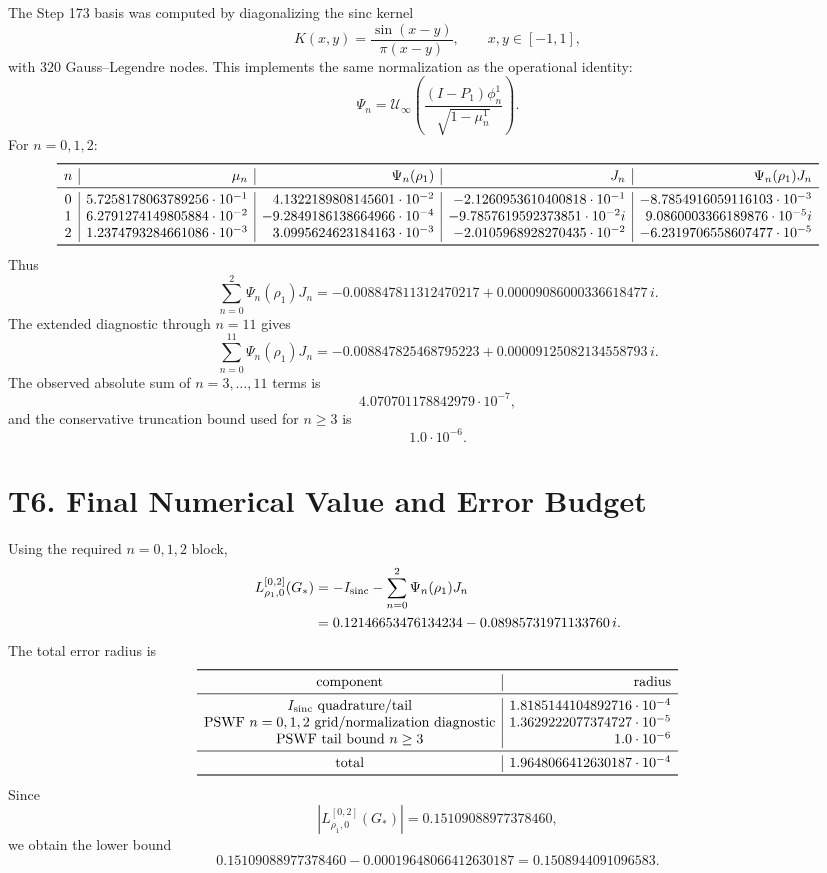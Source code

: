 \documentclass[11pt]{article}
\begin{document}
The Step 173 basis was computed by diagonalizing the sinc kernel
\[
K(x,y)=\frac{\sin(x-y)}{\pi(x-y)},\qquad x,y\in[-1,1],
\]
with \(320\) Gauss--Legendre nodes.  This implements the same normalization as
the operational identity:
\[
\Psi_n=\mathcal U_\infty
\left(\frac{(I-P_1)\phi_n^1}{\sqrt{1-\mu_n^1}}\right).
\]
For \(n=0,1,2\):
\[
\begin{array}{c|r|r|r|r}
\toprule
n & \mu_n & \Psi_n(\rho_1) & J_n & \Psi_n(\rho_1)J_n\\
\midrule
0 & 5.7258178063789256\cdot10^{-1}
& 4.1322189808145601\cdot10^{-2}
& -2.1260953610400818\cdot10^{-1}
& -8.7854916059116103\cdot10^{-3}\\
1 & 6.2791274149805884\cdot10^{-2}
& -9.2849186138664966\cdot10^{-4}
& -9.7857619592373851\cdot10^{-2}i
& 9.0860003366189876\cdot10^{-5}i\\
2 & 1.2374793284661086\cdot10^{-3}
& 3.0995624623184163\cdot10^{-3}
& -2.0105968928270435\cdot10^{-2}
& -6.2319706558607477\cdot10^{-5}\\
\bottomrule
\end{array}
\]
Thus
\[
\sum_{n=0}^{2}\Psi_n(\rho_1)J_n
=-0.008847811312470217
+0.00009086000336618477\,i.
\]
The extended diagnostic through \(n=11\) gives
\[
\sum_{n=0}^{11}\Psi_n(\rho_1)J_n
=-0.008847825468795223
+0.00009125082134558793\,i.
\]
The observed absolute sum of \(n=3,\ldots,11\) terms is
\[
4.070701178842979\cdot10^{-7},
\]
and the conservative truncation bound used for \(n\ge3\) is
\[
1.0\cdot10^{-6}.
\]

\section{T6. Final Numerical Value and Error Budget}

Using the required \(n=0,1,2\) block,
\[
\begin{aligned}
L_{\rho_1,0}^{[0,2]}(G_*)
&=-I_{\rm sinc}
-\sum_{n=0}^{2}\Psi_n(\rho_1)J_n\\
&=
0.12146653476134234
-0.08985731971133760\,i.
\end{aligned}
\]
The total error radius is
\[
\begin{array}{c|r}
\toprule
\text{component} & \text{radius}\\
\midrule
I_{\rm sinc}\ \text{quadrature/tail} & 1.8185144104892716\cdot10^{-4}\\
\text{PSWF \(n=0,1,2\) grid/normalization diagnostic} & 1.3629222077374727\cdot10^{-5}\\
\text{PSWF tail bound \(n\ge3\)} & 1.0\cdot10^{-6}\\
\midrule
\text{total} & 1.9648066412630187\cdot10^{-4}\\
\bottomrule
\end{array}
\]
Since
\[
|L_{\rho_1,0}^{[0,2]}(G_*)|
=0.15109088977378460,
\]
we obtain the lower bound
\[
0.15109088977378460-0.00019648066412630187
=0.1508944091096583.
\]
\end{document}
